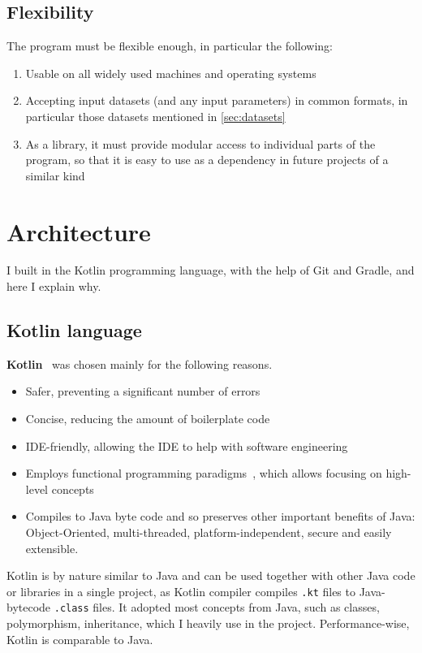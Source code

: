 \subsection{Flexibility}

The program must be flexible enough, in particular the following:
\begin{enumerate}[topsep=5pt,itemsep=0pt]
    \item Usable on all widely used machines and operating systems
    \item Accepting input datasets (and any input parameters) in common formats, in particular those datasets mentioned in \cref{sec:datasets}
    \item As a library, it must provide modular access to individual parts of the program, so that it is easy to use \graffs as a dependency in future projects of a similar kind
\end{enumerate}


\section{Architecture}

I built \graffs in the Kotlin programming language, with the help of Git and Gradle, and here I explain why.

\subsection{Kotlin language}

\textbf{Kotlin}~\cite{JemerovKotlinAction2017} was chosen mainly for the following reasons.
\begin{itemize}[topsep=5pt]
    \item Safer, preventing a significant number of errors
    \item Concise, reducing the amount of boilerplate code
    \item IDE-friendly, allowing the IDE to help with software engineering
    \item Employs functional programming paradigms~\cite{Bonev}, which allows focusing on high-level concepts
    \item Compiles to Java byte code and so preserves other important benefits of Java: Object-Oriented, multi-threaded, platform-independent, secure and easily extensible.
\end{itemize}

Kotlin is by nature similar to Java and can be used together with other Java code or libraries in a single project, as Kotlin compiler compiles \texttt{.kt} files to Java-bytecode \texttt{.class} files.
It adopted most concepts from Java, such as classes, polymorphism, inheritance, which I heavily use in the project.
Performance-wise, Kotlin is comparable to Java.

